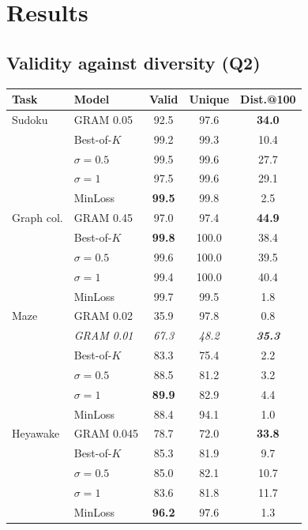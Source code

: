 \documentclass{article}
\newcommand{\Bok}{Best-of-$K$}
\begin{document}
\section{Results}
\label{sec:results}

\subsection{Validity against diversity (Q2)}
\label{sec:tradeoff}

\begin{table}[t]
\centering\footnotesize
\setlength{\tabcolsep}{2.5pt}
\begin{tabular}{@{}llccc@{}}
\toprule
Task & Model & Valid & Unique & Dist.@100 \\
\midrule
Sudoku & GRAM 0.05 & 92.5 & 97.6 & \textbf{34.0} \\
 & \Bok & 99.2 & 99.3 & 10.4 \\
 & \quad $\sigma=0.5$ & 99.5 & 99.6 & 27.7 \\
 & \quad $\sigma=1$ & 97.5 & 99.6 & 29.1 \\
 & MinLoss & \textbf{99.5} & 99.8 & 2.5 \\
\midrule
Graph col. & GRAM 0.45 & 97.0 & 97.4 & \textbf{44.9} \\
 & \Bok & \textbf{99.8} & 100.0 & 38.4 \\
 & \quad $\sigma=0.5$ & 99.6 & 100.0 & 39.5 \\
 & \quad $\sigma=1$ & 99.4 & 100.0 & 40.4 \\
 & MinLoss & 99.7 & 99.5 & 1.8 \\
\midrule
Maze & GRAM 0.02 & 35.9 & 97.8 & 0.8 \\
 & \emph{GRAM 0.01} & \emph{67.3} & \emph{48.2} & \emph{\textbf{35.3}} \\
 & \Bok & 83.3 & 75.4 & 2.2 \\
 & \quad $\sigma=0.5$ & 88.5 & 81.2 & 3.2 \\
 & \quad $\sigma=1$ & \textbf{89.9} & 82.9 & 4.4 \\
 & MinLoss & 88.4 & 94.1 & 1.0 \\
\midrule
Heyawake & GRAM 0.045 & 78.7 & 72.0 & \textbf{33.8} \\
 & \Bok & 85.3 & 81.9 & 9.7 \\
 & \quad $\sigma=0.5$ & 85.0 & 82.1 & 10.7 \\
 & \quad $\sigma=1$ & 83.6 & 81.8 & 11.7 \\
 & MinLoss & \textbf{96.2} & 97.6 & 1.3 \\
\midrule

\end{tabular}
\end{table}
\end{document}
